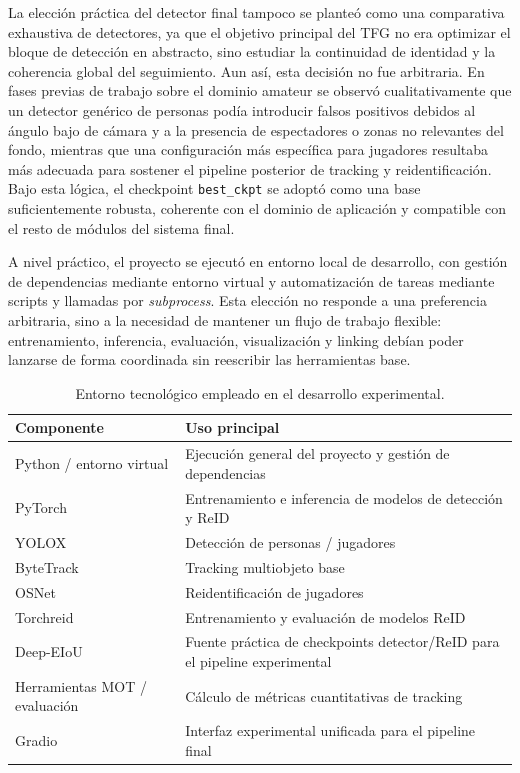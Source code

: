 \documentclass[../MAIN.tex]{subfiles}
\begin{document}
	La elección práctica del detector final tampoco se planteó como una comparativa exhaustiva de detectores, ya que el objetivo principal del TFG no era optimizar el bloque de detección en abstracto, sino estudiar la continuidad de identidad y la coherencia global del seguimiento. Aun así, esta decisión no fue arbitraria. En fases previas de trabajo sobre el dominio amateur se observó cualitativamente que un detector genérico de personas podía introducir falsos positivos debidos al ángulo bajo de cámara y a la presencia de espectadores o zonas no relevantes del fondo, mientras que una configuración más específica para jugadores resultaba más adecuada para sostener el pipeline posterior de tracking y reidentificación. Bajo esta lógica, el checkpoint \texttt{best\_ckpt} se adoptó como una base suficientemente robusta, coherente con el dominio de aplicación y compatible con el resto de módulos del sistema final.
	
	A nivel práctico, el proyecto se ejecutó en entorno local de desarrollo, con gestión de dependencias mediante entorno virtual y automatización de tareas mediante scripts y llamadas por \textit{subprocess}. Esta elección no responde a una preferencia arbitraria, sino a la necesidad de mantener un flujo de trabajo flexible: entrenamiento, inferencia, evaluación, visualización y linking debían poder lanzarse de forma coordinada sin reescribir las herramientas base.
	
	\begin{table}[H]
		\centering
		\caption{Entorno tecnológico empleado en el desarrollo experimental.}
		\label{tab:cap4_entorno}
		\begin{tabular}{p{4.0cm}p{8.0cm}}
			\toprule
			\textbf{Componente} & \textbf{Uso principal} \\
			\midrule
			Python / entorno virtual & Ejecución general del proyecto y gestión de dependencias \\
			PyTorch & Entrenamiento e inferencia de modelos de detección y ReID \\
			YOLOX & Detección de personas / jugadores \\
			ByteTrack & Tracking multiobjeto base \\
			OSNet & Reidentificación de jugadores \\
			Torchreid & Entrenamiento y evaluación de modelos ReID \\
			Deep-EIoU & Fuente práctica de checkpoints detector/ReID para el pipeline experimental \\
			Herramientas MOT / evaluación & Cálculo de métricas cuantitativas de tracking \\
			Gradio & Interfaz experimental unificada para el pipeline final \\
			\bottomrule
		\end{tabular}
	\end{table}
	
\end{document}
